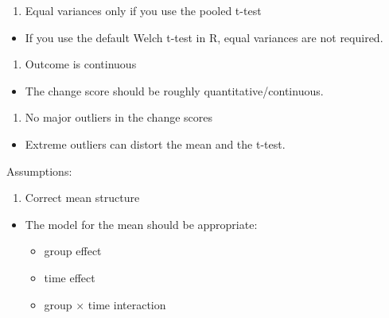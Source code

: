 \documentclass[
]{article}
\providecommand{\tightlist}{%
  \setlength{\itemsep}{0pt}\setlength{\parskip}{0pt}}
\begin{document}
\begin{enumerate}
\def\labelenumi{\arabic{enumi}.}
\setcounter{enumi}{2}
\tightlist
\item
  Equal variances only if you use the pooled t-test
\end{enumerate}

\begin{itemize}
\tightlist
\item
  If you use the default Welch t-test in R, equal variances are not
  required.
\end{itemize}

\begin{enumerate}
\def\labelenumi{\arabic{enumi}.}
\setcounter{enumi}{3}
\tightlist
\item
  Outcome is continuous
\end{enumerate}

\begin{itemize}
\tightlist
\item
  The change score should be roughly quantitative/continuous.
\end{itemize}

\begin{enumerate}
\def\labelenumi{\arabic{enumi}.}
\setcounter{enumi}{4}
\tightlist
\item
  No major outliers in the change scores
\end{enumerate}

\begin{itemize}
\tightlist
\item
  Extreme outliers can distort the mean and the t-test.
\end{itemize}

Assumptions:

\begin{enumerate}
\def\labelenumi{\arabic{enumi}.}
\tightlist
\item
  Correct mean structure
\end{enumerate}

\begin{itemize}
\tightlist
\item
  The model for the mean should be appropriate:

  \begin{itemize}
  \tightlist
  \item
    group effect
  \item
    time effect
  \item
    group × time interaction
  \end{itemize}
\end{itemize}
\end{document}
